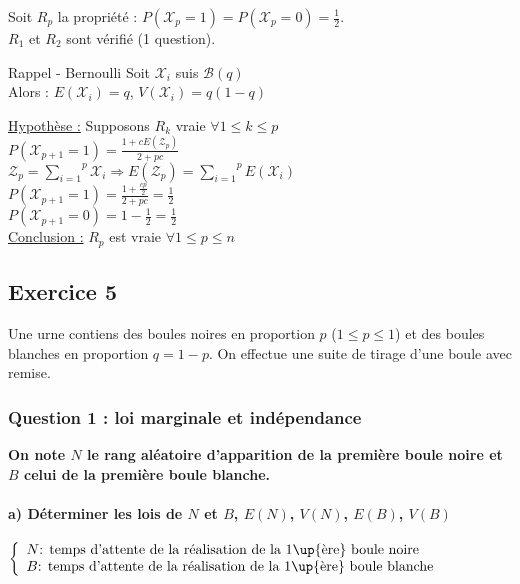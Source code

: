 \documentclass[a4paper, 12pt]{article}
\begin{document}
Soit $R_p$ la propriété  : $P (\mathcal{X}_p = 1) = P (\mathcal{X}_p = 0) = \frac{1}{2}$. \\
$R_1$ et $R_2$ sont vérifié (1 question). \\

\begin{rappel}{Rappel - Bernoulli}
Soit $\mathcal{X}_i$ suis $\mathcal{B} (q)$ \\
Alors : $E (\mathcal{X}_i) = q$, $V (\mathcal{X}_i) = q (1 - q)$
\end{rappel}

\underline{Hypothèse :} Supposons $R_k$ vraie $\forall 1 \leq k \leq p$ \\
$P (\mathcal{X}_{p + 1} = 1) = \frac{1 + c E(\mathcal{Z}_p)}{2 + pc}$ \\
$\mathcal{Z}_p = \overset{p}{\underset{i = 1}{\sum}} \mathcal{X}_i \Rightarrow E(\mathcal{Z}_p) = \overset{p}{\underset{i = 1}{\sum}} E (\mathcal{X}_i)$ \\
$P (\mathcal{X}_{p + 1} = 1) = \frac{1 + \frac{cp}{2}}{2 + pc} = \frac{1}{2}$ \\
$P (\mathcal{X}_{p + 1} = 0) = 1 - \frac{1}{2} = \boxed{\frac{1}{2}}$ \\

\underline{Conclusion :} $R_p$ est vraie $\forall 1 \leq p \leq n$



\subsection{Exercice 5}
Une urne contiens des boules noires en proportion $p$ ($1 \leq p \leq 1$) et des boules blanches en proportion $q = 1 - p$. On effectue une suite de tirage d'une boule avec remise.

\subsubsection{Question 1 : loi marginale et indépendance}
\textbf{On note $N$ le rang aléatoire d'apparition de la première boule noire et $B$ celui de la première boule blanche.}

\paragraph{a) Déterminer les lois de $N$ et $B$, $E(N)$, $V(N)$, $E(B)$, $V(B)$ \\}
$
\left \{
\begin{array}{l}
N \text{: temps d'attente de la réalisation de la 1\up{ère} boule noire} \\
B \text{: temps d'attente de la réalisation de la 1\up{ère} boule blanche}
\end{array}
\right .
$
\end{document}
